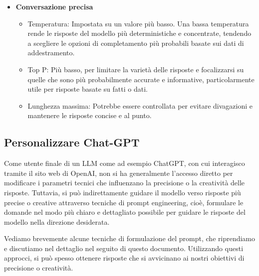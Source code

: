 \begin{itemize}
            \item \textbf{Conversazione precisa}
            \begin{itemize}
                \item Temperatura: Impostata su un valore più basso. Una bassa temperatura rende le risposte del modello più deterministiche e concentrate, tendendo a scegliere le opzioni di completamento più probabili basate sui dati di addestramento.
                \item Top P: Più basso, per limitare la varietà delle risposte e focalizzarsi su quelle che sono più probabilmente accurate e informative, particolarmente utile per risposte basate su fatti o dati.
                \item Lunghezza massima: Potrebbe essere controllata per evitare divagazioni e mantenere le risposte concise e al punto.
            \end{itemize}
        \end{itemize}
        
    \subsection{Personalizzare Chat-GPT}
        Come utente finale di un LLM come ad esempio ChatGPT, con cui interagisco tramite il sito web di OpenAI, non si ha generalmente l'accesso diretto per modificare i parametri tecnici che influenzano la precisione o la creatività delle risposte. Tuttavia, si può indirettamente guidare il modello verso risposte più precise o creative attraverso tecniche di prompt engineering, cioè, formulare le domande nel modo più chiaro e dettagliato possibile per guidare le risposte del modello nella direzione desiderata.

        Vediamo brevemente alcune tecniche di formulazione del prompt, che riprendiamo e discutiamo nel dettaglio nel seguito di questo documento. Utilizzando questi approcci, si può spesso ottenere risposte che si avvicinano ai nostri obiettivi di precisione o creatività.

